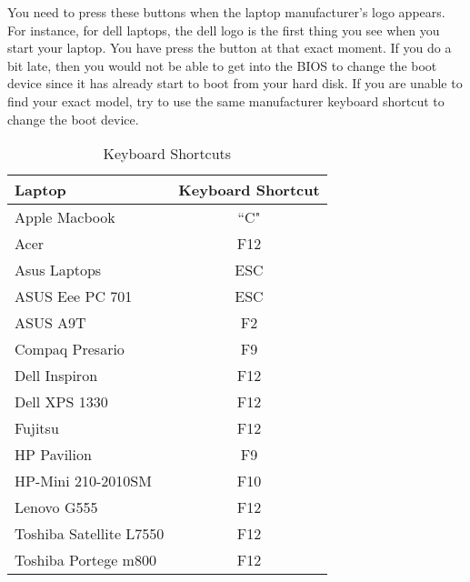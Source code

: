  
\par \noindent You need to press these buttons when the laptop manufacturer's logo appears. For instance, for dell laptops, the dell logo is the first thing you see when you start your laptop. You have press the button at that exact moment. If you do a bit late, then you would not be able to get into the BIOS to change the boot device since it has already start to boot from your hard disk. If you are unable to find your exact model, try to use the same manufacturer keyboard shortcut to change the boot device.  \\

\begin{table}[ht!]
	\centering
	\begin{tabular}{|p{5cm}|c|}
	\hline
	\textbf{Laptop} & \textbf{Keyboard Shortcut} \\
 	\hline
 	Apple Macbook					& ``C" \\
 	Acer										& F12\\
 	Asus Laptops						& ESC\\
 	ASUS Eee PC 701				& ESC\\
 	ASUS A9T								& F2\\
 	Compaq Presario				& F9\\
 	Dell Inspiron						& F12\\
 	Dell XPS 1330					& F12\\
 	Fujitsu									& F12\\
 	HP Pavilion 							& F9\\
 	HP-Mini 210-2010SM		& F10\\
 	Lenovo G555						& F12\\
 	Toshiba Satellite L7550 	& F12\\
 	Toshiba Portege m800	& F12\\
	\hline
	\end{tabular}
	\label{tab:keyboard-shortcuts}
	\caption{Keyboard Shortcuts}
\end{table}

